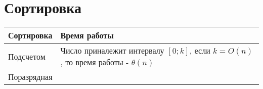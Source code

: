 \documentclass[12pt]{article}
\begin{document}
\tableofcontents\newpage

\section{Сортировка}

\begin{table}[h]
\begin{tabularx}{\textwidth}{|l|X|}
    Сортировка & Время работы \\\hline
    Подсчетом & Число приналежит интервалу $[0;k]$, если $k=O(n)$, то
    время работы - $\theta(n)$ \\
    Поразрядная & 
\end{tabularx}
\end{table}
\end{document}
